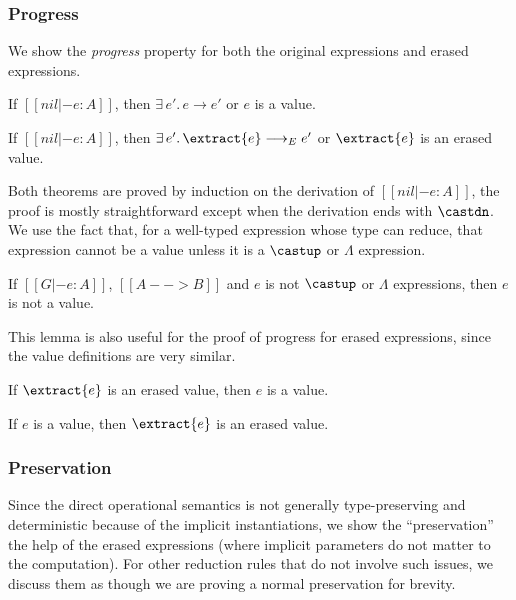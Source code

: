 \subsubsection{Progress} We show the \emph{progress} property for both the original expressions
and erased expressions.

\begin{theorem}[Progress]
    If $[[nil |- e : A]]$,
    then $\exists \, e'. \, e \longrightarrow e'$ or $e$ is a value.
\end{theorem}

\begin{theorem}
    If $[[nil |- e : A]]$,
    then $\exists \, e'. \, \extract{e} \longrightarrow_E e'$ or $\extract{e}$ is an erased value.
\end{theorem}

\noindent Both theorems are proved by induction on the derivation of $[[nil |- e : A]]$,
the proof is mostly straightforward except when the derivation ends with $\castdn$.
We use the fact that, for a well-typed expression whose type can reduce, that expression
cannot be a value unless it is a $\castup$ or $\Lambda$ expression.

\begin{lemma}
    If $[[G |- e : A]]$, $[[A --> B]]$ and $e$ is not $\castup$ or $\Lambda$ expressions,
    then $e$ is not a value.
\end{lemma}

This lemma is also useful for the proof of progress for erased expressions, since the
value definitions are very similar.

\begin{lemma}
    If $\extract{e}$ is an erased value, then $e$ is a value.
\end{lemma}

\begin{lemma}
    If $e$ is a value, then $\extract{e}$ is an erased value.
\end{lemma}


\subsubsection{Preservation}

Since the direct operational semantics is not generally type-preserving and
deterministic because of the implicit instantiations, we show the
``preservation'' the help of the erased expressions (where implicit parameters
do not matter to the computation). For other reduction rules that do not involve
such issues, we discuss them as though we are proving a normal preservation
for brevity.

